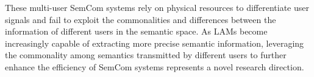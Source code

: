 These multi-user SemCom systems rely on physical resources to differentiate user signals and fail to exploit the commonalities and differences between the information of different users in the semantic space. As LAMs become increasingly capable of extracting more precise semantic information, leveraging the commonality among semantics transmitted by different users to further enhance the efficiency of SemCom systems represents a novel research direction.